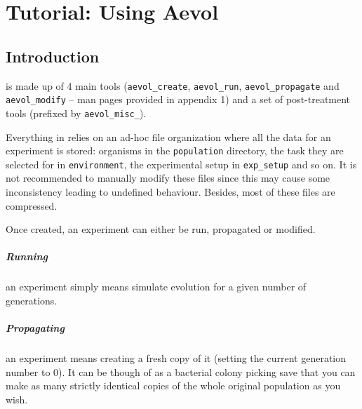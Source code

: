 \chapter{Tutorial: Using Aevol}
\label{chap:using-aevol}


\vspace{5mm}

\section{Introduction}

\aevol{} is made up of 4 main tools (\verb?aevol_create?, \verb?aevol_run?, \verb?aevol_propagate? and \verb?aevol_modify? -- man pages provided in appendix 1) and a set of post-treatment tools (prefixed by \verb?aevol_misc_?).

Everything in \aevol{} relies on an ad-hoc file organization where all the data for an experiment is stored: organisms in the \verb?population? directory, the task they are selected for in \verb?environment?, the experimental setup in \verb?exp_setup? and so on. It is not recommended to manually modify these files since this may cause some inconsistency leading to undefined behaviour. Besides, most of these files are compressed.

Once created, an experiment can either be run, propagated or modified.

\vspace{-7mm}
\paragraph{Running}an experiment simply means simulate evolution for a given number of generations.

\vspace{-7mm}
\paragraph{Propagating}an experiment means creating a fresh copy of it (setting the current generation number to 0). It can be though of as a bacterial colony picking save that you can make as many strictly identical copies of the whole original population as you wish.

\vspace{-7mm}
